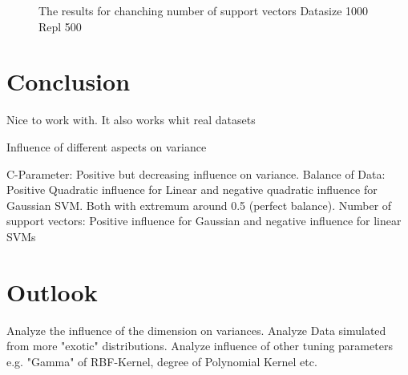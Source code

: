 \documentclass[letterpaper]{article}
\begin{document}
\begin{figure}[!htb]
\begin{center}

\caption{The results for chanching number of support vectors Datasize 1000 Repl 500}
\label{fig1}
\end{center}
\end{figure}


\section{Conclusion}
Nice to work with. It also works whit real datasets

Influence of different aspects on variance


C-Parameter: Positive but decreasing influence on variance. Balance of Data: Positive Quadratic influence for Linear and negative quadratic influence for Gaussian SVM. Both with extremum around 0.5 (perfect balance).
Number of support vectors: Positive influence for Gaussian and negative influence for linear SVMs

\section{Outlook}


Analyze the influence of the dimension on variances. Analyze Data simulated from more "exotic" distributions. Analyze influence of other tuning parameters e.g. "Gamma" of RBF-Kernel, degree of Polynomial Kernel etc.




\footnotesize


\end{document}
